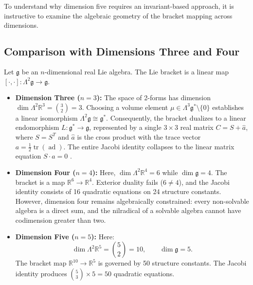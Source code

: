 \documentclass[11pt,a4paper]{article}
\theoremstyle{definition}
\theoremstyle{remark}
\newcommand{\R}{\mathbb{R}}
\newcommand{\g}{\mathfrak{g}}
\newcommand{\ad}{\operatorname{ad}}
\newcommand{\tr}{\operatorname{tr}}
\begin{document}
To understand why dimension five requires an invariant-based approach, it is instructive to examine the algebraic geometry of the bracket mapping across dimensions.

\subsection{Comparison with Dimensions Three and Four}
Let $\g$ be an $n$-dimensional real Lie algebra. The Lie bracket is a linear map $[\cdot, \cdot] \colon \Lambda^2 \g \to \g$.
\begin{itemize}
    \item \textbf{Dimension Three ($n = 3$):} The space of 2-forms has dimension $\dim \Lambda^2 \R^3 = \binom{3}{2} = 3$. Choosing a volume element $\mu \in \Lambda^3 \g^* \setminus \{0\}$ establishes a linear isomorphism $\Lambda^2 \g \cong \g^*$. Consequently, the bracket dualizes to a linear endomorphism $L \colon \g^* \to \g$, represented by a single $3 \times 3$ real matrix $C = S + \hat{a}$, where $S = S^T$ and $\hat{a}$ is the cross product with the trace vector $a = \frac{1}{2}\tr(\ad)$. The entire Jacobi identity collapses to the linear matrix equation $S \cdot a = 0$ \citep{Milnor1976}.
    \item \textbf{Dimension Four ($n = 4$):} Here, $\dim \Lambda^2 \R^4 = 6$ while $\dim \g = 4$. The bracket is a map $\R^6 \to \R^4$. Exterior duality fails ($6 \neq 4$), and the Jacobi identity consists of 16 quadratic equations on 24 structure constants. However, dimension four remains algebraically constrained: every non-solvable algebra is a direct sum, and the nilradical of a solvable algebra cannot have codimension greater than two.
    \item \textbf{Dimension Five ($n = 5$):} Here:
    \begin{equation}
        \dim \Lambda^2 \R^5 = \binom{5}{2} = 10, \qquad \dim \g = 5.
    \end{equation}
    The bracket map $\R^{10} \to \R^5$ is governed by 50 structure constants. The Jacobi identity produces $\binom{5}{3} \times 5 = 50$ quadratic equations. 
\end{itemize}
\end{document}
